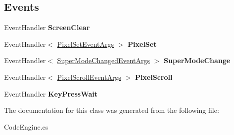 \subsection*{Events}
\begin{DoxyCompactItemize}
\item 
\hypertarget{class_eimu_1_1_core_1_1_systems_1_1_s_chip8_1_1_code_engine_ace44c3d820a7f0e92a43290cbbc9cd69}{
EventHandler {\bfseries ScreenClear}}
\label{class_eimu_1_1_core_1_1_systems_1_1_s_chip8_1_1_code_engine_ace44c3d820a7f0e92a43290cbbc9cd69}

\item 
\hypertarget{class_eimu_1_1_core_1_1_systems_1_1_s_chip8_1_1_code_engine_a1ae7ea551cbea35085eccf9b7112d2b3}{
EventHandler$<$ \hyperlink{class_eimu_1_1_core_1_1_systems_1_1_s_chip8_1_1_pixel_set_event_args}{PixelSetEventArgs} $>$ {\bfseries PixelSet}}
\label{class_eimu_1_1_core_1_1_systems_1_1_s_chip8_1_1_code_engine_a1ae7ea551cbea35085eccf9b7112d2b3}

\item 
\hypertarget{class_eimu_1_1_core_1_1_systems_1_1_s_chip8_1_1_code_engine_a06b10f47543587d17b9f2659450d5c4d}{
EventHandler$<$ \hyperlink{class_eimu_1_1_core_1_1_systems_1_1_s_chip8_1_1_super_mode_changed_event_args}{SuperModeChangedEventArgs} $>$ {\bfseries SuperModeChange}}
\label{class_eimu_1_1_core_1_1_systems_1_1_s_chip8_1_1_code_engine_a06b10f47543587d17b9f2659450d5c4d}

\item 
\hypertarget{class_eimu_1_1_core_1_1_systems_1_1_s_chip8_1_1_code_engine_a26fa3df91996419878e46873cc42fc60}{
EventHandler$<$ \hyperlink{class_eimu_1_1_core_1_1_systems_1_1_s_chip8_1_1_pixel_scroll_event_args}{PixelScrollEventArgs} $>$ {\bfseries PixelScroll}}
\label{class_eimu_1_1_core_1_1_systems_1_1_s_chip8_1_1_code_engine_a26fa3df91996419878e46873cc42fc60}

\item 
\hypertarget{class_eimu_1_1_core_1_1_systems_1_1_s_chip8_1_1_code_engine_a4a8d12ed0a5883c92041b489129b075a}{
EventHandler {\bfseries KeyPressWait}}
\label{class_eimu_1_1_core_1_1_systems_1_1_s_chip8_1_1_code_engine_a4a8d12ed0a5883c92041b489129b075a}

\end{DoxyCompactItemize}


The documentation for this class was generated from the following file:\begin{DoxyCompactItemize}
\item 
CodeEngine.cs\end{DoxyCompactItemize}
